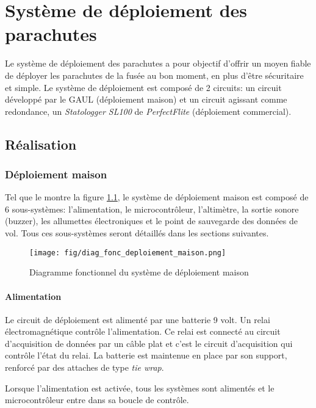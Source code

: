 \chapter{Système de déploiement des parachutes}
\label{chap:deploiement}

Le système de déploiement des parachutes a pour objectif d'offrir un moyen
fiable de déployer les parachutes de la fusée au bon moment, en plus d'être
sécuritaire et simple. Le système de déploiement est composé de 2 circuits: un
circuit développé par le GAUL (déploiement maison) et un circuit agissant comme
redondance, un \textit{Statologger SL100} de \textit{PerfectFlite} (déploiement
commercial).

\section{Réalisation}

\subsection{Déploiement maison}


Tel que le montre la figure \ref{f:diag_fonc_deploiement_maison}, le système de
déploiement maison est composé de 6 sous-systèmes: l'alimentation, le
microcontrôleur, l'altimètre, la sortie sonore (buzzer), les allumettes
électroniques et le point de sauvegarde des données de vol. Tous ces
sous-systèmes seront détaillés dans les sections suivantes.

\begin{figure}[H]
	\center
	\texttt{[image: fig/diag\_fonc\_deploiement\_maison.png]}
	\caption{Diagramme fonctionnel du système de déploiement maison}
	\label{f:diag_fonc_deploiement_maison}
\end{figure}

\subsubsection{Alimentation}

Le circuit de déploiement est alimenté par une batterie 9 volt. Un relai
électromagnétique contrôle l'alimentation. Ce relai est connecté au circuit
d'acquisition de données par un câble plat et c'est le circuit d'acquisition
qui contrôle l'état du relai. La batterie est maintenue en place par son
support, renforcé par des attaches de type \textit{tie wrap}.
\\
\par
Lorsque l'alimentation est activée, tous les systèmes sont alimentés et le
microcontrôleur entre dans sa boucle de contrôle.

